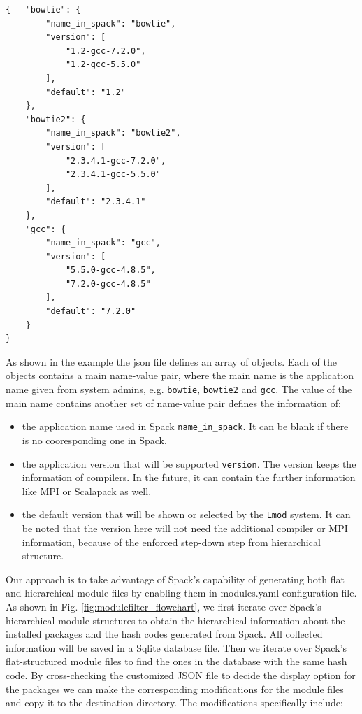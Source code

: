 \documentclass[conference]{IEEEtran}
\begin{document}
\begin{verbatim}
{   "bowtie": {
        "name_in_spack": "bowtie",
        "version": [
            "1.2-gcc-7.2.0",
            "1.2-gcc-5.5.0"
        ],
        "default": "1.2"
    },
    "bowtie2": {
        "name_in_spack": "bowtie2",
        "version": [
            "2.3.4.1-gcc-7.2.0",
            "2.3.4.1-gcc-5.5.0"
        ],
        "default": "2.3.4.1"
    },
    "gcc": {
        "name_in_spack": "gcc",
        "version": [
            "5.5.0-gcc-4.8.5",
            "7.2.0-gcc-4.8.5"
        ],
        "default": "7.2.0"
    }
}
\end{verbatim}


As shown in the example the json file defines an array of objects. Each of the objects contains a main name-value pair, where the main name is the application name given from system admins, e.g. \verb|bowtie|, \verb|bowtie2| and \verb|gcc|. The value of the main name contains another set of name-value pair defines the information of: 

\begin{itemize}
    \item the application name used in Spack \verb|name_in_spack|. It can be blank if there is no cooresponding one in Spack.
    \item the application version that will be supported \verb|version|. The version keeps the information of compilers. In the future, it can contain the further information like MPI or Scalapack as well.
    \item the default version that will be shown or selected by the \verb|Lmod| system. It can be noted that the version here will not need the additional compiler or MPI information, because of the enforced step-down step from hierarchical structure. 
\end{itemize}

Our approach is to take advantage of Spack's capability of generating both flat and hierarchical module files by enabling them in modules.yaml configuration file. As shown in Fig. \ref{fig:modulefilter_flowchart}, we first iterate over Spack's hierarchical module structures to obtain the hierarchical information about the installed packages and the hash codes generated from Spack. All collected information will be saved in a Sqlite database file. Then we iterate over Spack's flat-structured module files to find the ones in the database with the same hash code. By cross-checking the customized JSON file to decide the display option for the packages we can make the corresponding modifications for the module files and copy it to the destination directory. The modifications specifically include:
\end{document}
